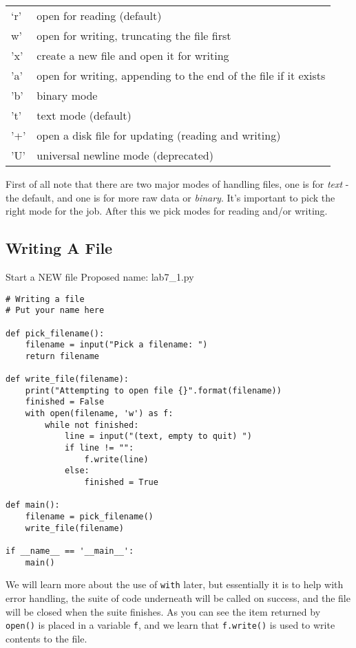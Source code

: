 \documentclass[12pt,oneside]{cttutorial}
\begin{document}
\begin{center}
\begin{tabular}{|l|l|}
\hline
`r' & open for reading (default) \\
w' & open for writing, truncating the file first \\
'x' & create a new file and open it for writing \\
'a' & open for writing, appending to the end of the file if it exists \\
'b' & binary mode \\
't' &text mode (default) \\
'+' & open a disk file for updating (reading and writing) \\
'U' & universal newline mode (deprecated) \\
 \hline
\end{tabular}
\end{center}

First of all note that there are two major modes of handling files, one is for \emph{text} - the default, and one is for more raw data or \emph{binary}. It's important to pick the right mode for the job. After this we pick modes for reading and/or writing.

\subsection{Writing A File}

\alert{Start a NEW file}
Proposed name: lab7\_1.py
\begin{lstlisting}
# Writing a file
# Put your name here

def pick_filename():
    filename = input("Pick a filename: ")
    return filename

def write_file(filename):
    print("Attempting to open file {}".format(filename))
    finished = False
    with open(filename, 'w') as f:
        while not finished:
            line = input("(text, empty to quit) ")
            if line != "":
                f.write(line)
            else:
                finished = True
            
def main():
    filename = pick_filename()
    write_file(filename)

if __name__ == '__main__':
    main()
\end{lstlisting}

We will learn more about the use of \lstinline!with! later, but essentially it is to help with error handling, the suite of code underneath will be called on success, and the file will be closed when the suite finishes. As you can see the item returned by \lstinline!open()! is placed in a variable \lstinline!f!, and we learn that \lstinline!f.write()! is used to write contents to the file.
\end{document}
